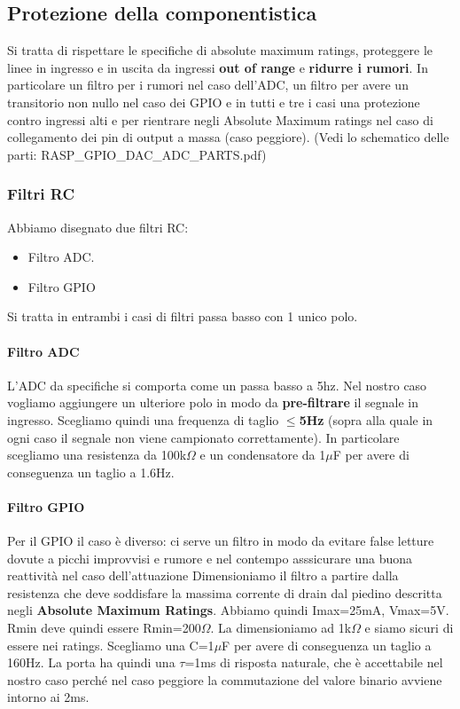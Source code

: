 \documentclass[10pt]{article}
\begin{document}
	\subsection{Protezione della componentistica}
		Si tratta di rispettare le specifiche di absolute maximum ratings, proteggere le linee in ingresso e in uscita da ingressi \textbf{out of range} e \textbf{ridurre i rumori}.
		In particolare un filtro per i rumori nel caso dell'ADC, un filtro per avere un transitorio non nullo nel caso dei GPIO e in tutti e tre i casi una protezione contro ingressi alti e per rientrare negli Absolute Maximum ratings nel caso di collegamento dei pin di output a massa (caso peggiore).
		(Vedi lo schematico delle parti: RASP\_GPIO\_DAC\_ADC\_PARTS.pdf)
		\subsubsection{Filtri RC}
		Abbiamo disegnato due filtri RC:
		\begin{itemize}
		        \item Filtro ADC.
		        \item Filtro GPIO
		\end{itemize}
		Si tratta in entrambi i casi di filtri passa basso con 1 unico polo.
			\paragraph{Filtro ADC}
				L'ADC da specifiche si comporta come un passa basso a 5hz. Nel nostro caso vogliamo aggiungere un ulteriore polo in modo da \textbf{pre-filtrare} il segnale in ingresso.
				Scegliamo quindi una frequenza di taglio \textbf{\(\le\)5Hz} (sopra alla quale in ogni caso il segnale non viene campionato correttamente).
				In particolare scegliamo una resistenza da 100k\(\Omega\) e un condensatore da 1\(\mu\)F per avere di conseguenza un taglio a 1.6Hz.
			\paragraph{Filtro GPIO}
				Per il GPIO il caso è diverso: ci serve un filtro in modo da evitare false letture dovute a picchi improvvisi e rumore e nel contempo asssicurare una buona reattività nel caso dell'attuazione
				Dimensioniamo il filtro a partire dalla resistenza che deve soddisfare la massima corrente di drain dal piedino descritta negli \textbf{Absolute Maximum Ratings}.
				Abbiamo quindi Imax=25mA, Vmax=5V. Rmin deve quindi essere Rmin=200\(\Omega\). La dimensioniamo ad 1k\(\Omega\) e siamo sicuri di essere nei ratings.
				Scegliamo una C=1\(\mu\)F per avere di conseguenza un taglio a 160Hz. La porta ha quindi una \(\tau\)=1ms di risposta naturale, che è accettabile nel nostro caso perché nel caso peggiore la commutazione del valore binario avviene intorno ai 2ms.
\end{document}

